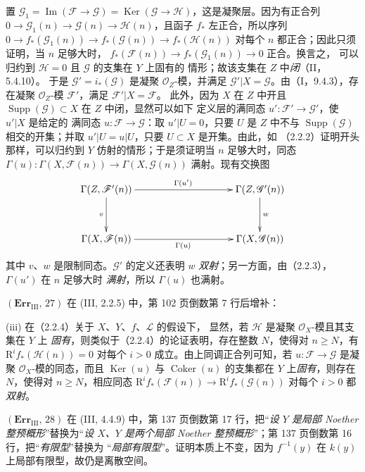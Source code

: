 \documentclass[UTF8,fontset=none,11pt,oneside,openany]{ctexbook}
\newcommand{\oldpage}[2][]{%
  \hypertarget{ega-source-page-#1-#2}{}%
  \marginnote{\scriptsize\textbf{#1}~|~#2}\ignorespaces}
\begin{document}
\oldpage[III]{222}
置
$\mathscr G_1=\operatorname{Im}(\mathscr F\to\mathscr G)
=\operatorname{Ker}(\mathscr G\to\mathscr H)$，这是凝聚层。因为有正合列
$0\to\mathscr G_1(n)\to\mathscr G(n)\to\mathscr H(n)$，且函子 $f_*$
左正合，所以序列
$0\to f_*(\mathscr G_1(n))\to f_*(\mathscr G(n))\to f_*(\mathscr H(n))$
对每个 $n$ 都正合；因此只须证明，当 $n$ 足够大时，
$f_*(\mathscr F(n))\to f_*(\mathscr G_1(n))\to0$ 正合。换言之，
可以归约到 $\mathscr H=0$ 且 $\mathscr G$ 的支集在 $Y$ 上固有的
情形；故该支集在 $Z$ 中\emph{闭}（II，5.4.10）。
于是 $\mathscr G'=i_*(\mathscr G)$ 是凝聚 $\mathscr O_Z$-模，并满足
$\mathscr G'|X=\mathscr G$。由（I，9.4.3），存在凝聚
$\mathscr O_Z$-模 $\mathscr F'$，满足 $\mathscr F'|X=\mathscr F$。
此外，因为 $X$ 在 $Z$ 中开且
$\operatorname{Supp}(\mathscr G)\subset X$ 在 $Z$ 中闭，显然可以如下
定义层的满同态 $u':\mathscr F'\to\mathscr G'$，使 $u'|X$ 是给定的
满同态 $u:\mathscr F\to\mathscr G$：取 $u'|U=0$，只要 $U$ 是
$Z$ 中不与 $\operatorname{Supp}(\mathscr G)$ 相交的开集；并取
$u'|U=u|U$，只要 $U\subset X$ 是开集。由此，如
（2.2.2）证明开头那样，可以归约到 $Y$ 仿射的情形；于是须证明当
$n$ 足够大时，同态
$\Gamma(u):\Gamma(X,\mathscr F(n))\to\Gamma(X,\mathscr G(n))$
满射。现有交换图
\[
\xymatrix@C=35mm@R=12mm{
\Gamma(Z,\mathscr F'(n)) \ar[r]^{\Gamma(u')} \ar[d]_v &
\Gamma(Z,\mathscr G'(n)) \ar[d]^w \\
\Gamma(X,\mathscr F(n)) \ar[r]_{\Gamma(u)} & \Gamma(X,\mathscr G(n))
}
\]
其中 $v$、$w$ 是限制同态。$\mathscr G'$ 的定义还表明 $w$
\emph{双射}；另一方面，由（2.2.3），$\Gamma(u')$ 在 $n$ 足够大时
\emph{满射}，所以 $\Gamma(u)$ 也满射。

\noindent\textbf{$(\mathbf{Err}_{\mathrm{III}},\,27)$} 在
(III, 2.2.5) 中，第 102 页倒数第 7 行后增补：

(iii) 在（2.2.4）关于 $X$、$Y$、$f$、$\mathscr L$ 的假设下，
显然，若 $\mathscr H$ 是凝聚 $\mathscr O_X$-模且其支集在 $Y$ 上
\emph{固有}，则类似于（2.2.4）的论证表明，存在整数 $N$，使得对
$n\geq N$，有 $\mathrm R^if_*(\mathscr H(n))=0$ 对每个 $i>0$
成立。由上同调正合列可知，若
$u:\mathscr F\to\mathscr G$ 是凝聚 $\mathscr O_X$-模的同态，而且
$\operatorname{Ker}(u)$ 与 $\operatorname{Coker}(u)$ 的支集都在
$Y$ 上\emph{固有}，则存在 $N$，使得对 $n\geq N$，相应同态
$\mathrm R^if_*(\mathscr F(n))\to\mathrm R^if_*(\mathscr G(n))$
对每个 $i>0$ 都\emph{双射}。

\noindent\textbf{$(\mathbf{Err}_{\mathrm{III}},\,28)$} 在
(III, 4.4.9) 中，第 137 页倒数第 17 行，把“\emph{设 $Y$ 是局部
Noether 整预概形}”替换为“\emph{设 $X$、$Y$ 是两个局部 Noether
整预概形}”；第 137 页倒数第 16 行，把“\emph{有限型}”替换为
“\emph{局部有限型}”。证明本质上不变，因为 $f^{-1}(y)$ 在
$k(y)$ 上局部有限型，故仍是离散空间。
\end{document}
